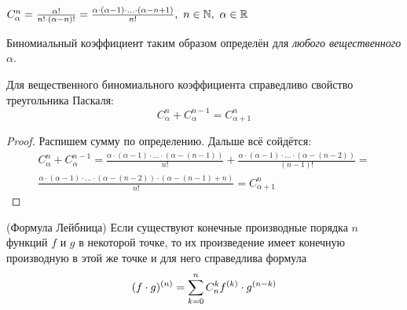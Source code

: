 
\begin{definition}
	$C_{\alpha}^n = \frac{\alpha!}{n! \cdot (\alpha - n)!} =
		\frac{\alpha \cdot (\alpha - 1) \cdot \ldots \cdot
		(\alpha - n + 1)}{n!},\ n \in \mathbb{N},\ \alpha \in \mathbb{R}$
\end{definition}

\begin{note}
	Биномиальный коэффициент таким образом определён для
	\textit{любого вещественного $\alpha$}.
\end{note}

\begin{lemma}
	Для вещественного биномиального коэффициента справедливо
	свойство треугольника Паскаля:
	\[
		C_\alpha^n + C_\alpha^{n - 1} = C_{\alpha + 1}^n
	\]
\end{lemma}

\begin{proof}
	Распишем сумму по определению. Дальше всё сойдётся:
	\begin{multline*}
		C_\alpha^n + C_\alpha^{n - 1} = \frac{\alpha \cdot
		(\alpha - 1) \cdot \ldots \cdot (\alpha - (n - 1))}{n!} + \frac{\alpha \cdot (\alpha - 1) \cdot \ldots \cdot (\alpha - (n - 2))}{(n - 1)!} =
		\\
		\frac{\alpha \cdot (\alpha - 1) \cdot \ldots \cdot
		(\alpha - (n - 2)) \cdot (\alpha - (n - 1) + n)}{n!} =
		C_{\alpha + 1}^n
	\end{multline*}
\end{proof}

\begin{theorem} (Формула Лейбница)
	Если существуют конечные производные порядка $n$ функций
	$f$ и $g$ в некоторой точке, то их произведение имеет
	конечную производную в этой же точке и для него справедлива формула
	\[
		(f \cdot g)^{(n)} = \sum\limits_{k = 0}^{n} C_n^k f^{(k)}
		\cdot g^{(n - k)}
	\]
\end{theorem}

